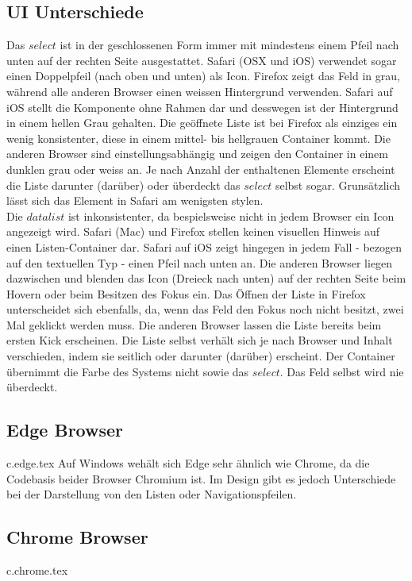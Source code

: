 \subsection{UI Unterschiede}
Das $select$ ist in der geschlossenen Form immer mit mindestens einem Pfeil nach unten auf der rechten Seite ausgestattet.
Safari (OSX und iOS) verwendet sogar einen Doppelpfeil (nach oben und unten) als Icon.
Firefox zeigt das Feld in grau, während alle anderen Browser einen weissen Hintergrund verwenden.
Safari auf iOS stellt die Komponente ohne Rahmen dar und desswegen ist der Hintergrund in einem hellen Grau gehalten.
Die geöffnete Liste ist bei Firefox als einziges ein wenig konsistenter, diese in einem mittel- bis hellgrauen Container kommt.
Die anderen Browser sind einstellungsabhängig und zeigen den Container in einem dunklen grau oder weiss an.
Je nach Anzahl der enthaltenen Elemente erscheint die Liste darunter (darüber) oder überdeckt das $select$ selbst sogar.
Grunsätzlich lässt sich das Element in Safari am wenigsten stylen.
\\
Die $datalist$ ist inkonsistenter, da bespielsweise nicht in jedem Browser ein Icon angezeigt wird.
Safari (Mac) und Firefox stellen keinen visuellen Hinweis auf einen Listen-Container dar.
Safari auf iOS zeigt hingegen in jedem Fall - bezogen auf den textuellen Typ - einen Pfeil nach unten an.
Die anderen Browser liegen dazwischen und blenden das Icon (Dreieck nach unten) auf der rechten Seite beim Hovern oder beim Besitzen des Fokus ein.
Das Öffnen der Liste in Firefox unterscheidet sich ebenfalls, da, wenn das Feld den Fokus noch nicht besitzt, zwei Mal geklickt werden muss.
Die anderen Browser lassen die Liste bereits beim ersten Kick erscheinen.
Die Liste selbst verhält sich je nach Browser und Inhalt verschieden, indem sie seitlich oder darunter (darüber) erscheint.
Der Container übernimmt die Farbe des Systems nicht sowie das $select$.
Das Feld selbst wird nie überdeckt. 

\clearpage
\subsection{Edge Browser}
{c.edge.tex}
Auf Windows wehält sich Edge sehr ähnlich wie Chrome, da die Codebasis beider Browser Chromium ist.
Im Design gibt es jedoch Unterschiede bei der Darstellung von den Listen oder Navigationspfeilen. 

\clearpage
\subsection{Chrome Browser}
{c.chrome.tex}


